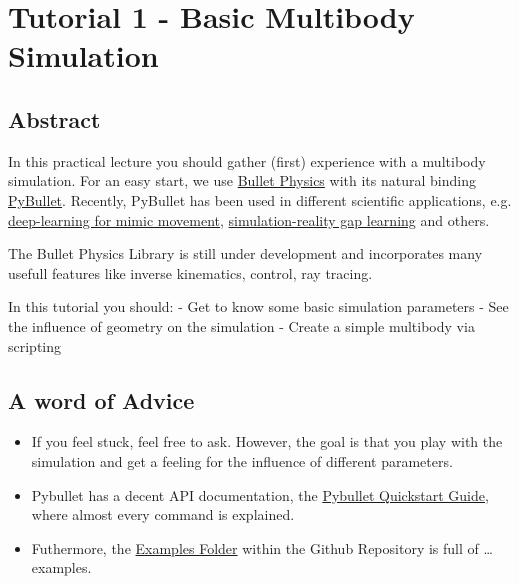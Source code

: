 \hypertarget{tutorial-1---basic-multibody-simulation}{%
\section{Tutorial 1 - Basic Multibody
Simulation}\label{tutorial-1---basic-multibody-simulation}}

\hypertarget{abstract}{%
\subsection{Abstract}\label{abstract}}

In this practical lecture you should gather (first) experience with a
multibody simulation. For an easy start, we use
\href{https://github.com/bulletphysics/bullet3}{Bullet Physics} with its
natural binding \href{https://pybullet.org/wordpress/}{PyBullet}.
Recently, PyBullet has been used in different scientific applications,
e.g. \href{https://youtu.be/t-gSFn24ZKs}{deep-learning for mimic
movement}, \href{https://youtu.be/xf_UXK0OTIk}{simulation-reality gap
learning} and others.

The Bullet Physics Library is still under development and incorporates
many usefull features like inverse kinematics, control, ray tracing.

In this tutorial you should: - Get to know some basic simulation
parameters - See the influence of geometry on the simulation - Create a
simple multibody via scripting

\hypertarget{a-word-of-advice}{%
\subsection{A word of Advice}\label{a-word-of-advice}}

\begin{itemize}
\item
  If you feel stuck, feel free to ask. However, the goal is that you
  play with the simulation and get a feeling for the influence of
  different parameters.
\item
  Pybullet has a decent API documentation, the
  \href{https://docs.google.com/document/d/10sXEhzFRSnvFcl3XxNGhnD4N2SedqwdAvK3dsihxVUA/edit\#heading=h.2ye70wns7io3}{Pybullet
  Quickstart Guide}, where almost every command is explained.
\item
  Futhermore, the
  \href{https://github.com/bulletphysics/bullet3/tree/master/examples/pybullet/examples}{Examples
  Folder} within the Github Repository is full of \ldots{}examples.
\end{itemize}


